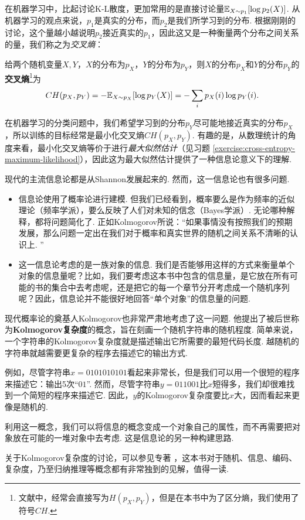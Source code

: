在机器学习中，比起讨论K-L散度，更加常用的是直接讨论量$\mathbb{E}_{X\sim p_1}[\log p_2(X)]$. 从机器学习的观点来说，$p_1$是真实的分布，而$p_2$是我们所学习到的分布. 根据刚刚的讨论，这个量越小越说明$p_2$接近真实的$p_1$，因此这又是一种衡量两个分布之间关系的量，我们称之为\textit{交叉熵}：
\begin{definition}[交叉熵]
给两个随机变量$X,Y$，$X$的分布为$p_X$，$Y$的分布为$p_Y$，则$X$的分布$p_X$和$Y$的分布$p_Y$的\textbf{交叉熵}\footnote{文献中，经常会直接写为$H(p_X,p_Y)$，但是在本书中为了区分熵，我们使用了符号$CH$.}为
\[CH(p_X,p_Y)=-\mathbb{E}_{X\sim p_X}[\log p_Y(X)]=-\sum_ip_X(i)\log p_Y(i).\]
\end{definition}

在机器学习的分类问题中，我们希望学习到的分布$p_Y$尽可能地接近真实的分布$p_X$，所以训练的目标经常是最小化交叉熵$CH(p_X,p_Y)$. 有趣的是，从数理统计的角度来看，最小化交叉熵等价于进行\textit{最大似然估计}（见习题 \ref{exercise:cross-entropy-maximum-likelihood}），因此这为最大似然估计提供了一种信息论意义下的理解.

\begin{remark}
现代的主流信息论都是从Shannon发展起来的. 然而，这一信息论也有很多问题. 
\begin{itemize}
    \item 信息论使用了概率论进行建模. 但我们已经看到，概率要么是作为频率的近似理论（频率学派），要么反映了人们对未知的信念（Bayes学派）. 无论哪种解释，都将问题简化了. 正如Kolmogorov所说：“如果事情没有按照我们的预期发展，那么问题一定出在我们对于概率和真实世界的随机之间关系不清晰的认识上. ”
    \item 这一信息论考虑的是一族对象的信息. 我们是否能够用这样的方式来衡量单个对象的信息量呢？比如，我们要考虑这本书中包含的信息量，是它放在所有可能的书的集合中去考虑呢，还是把它的每一个章节分开考虑成一个随机序列呢？因此，信息论并不能很好地回答“单个对象”的信息量的问题. 
\end{itemize}

现代概率论的奠基人Kolmogorov也非常严肃地考虑了这一问题. 他提出了被后世称为\textbf{Kolmogorov复杂度}的概念，旨在刻画一个随机字符串的随机程度. 简单来说，一个字符串的Kolmogorov复杂度就是描述输出它所需要的最短代码长度. 越随机的字符串就越需要更复杂的程序去描述它的输出方式. 

例如，尽管字符串$x=0101010101$看起来非常长，但是我们可以用一个很短的程序来描述它：输出5次“$01$”. 然而，尽管字符串$y=011001$比$x$短得多，我们却很难找到一个简短的程序来描述它. 因此，$y$的Kolmogorov复杂度要比$x$大，因而看起来更像是随机的.

利用这一概念，我们可以将信息的概念变成一个对象自己的属性，而不再需要把对象放在可能的一堆对象中去考虑. 这是信息论的另一种构建思路. 


关于Kolmogorov复杂度的讨论，可以参见专著 \cite{liIntroductionKolmogorovComplexity2019}，这本书对于随机、信息、编码、复杂度，乃至归纳推理等概念都有非常独到的见解，值得一读. 
\end{remark}

